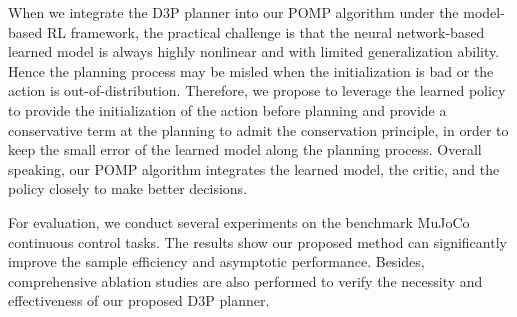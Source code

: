 \documentclass{article} %
\begin{document}
When we integrate the D3P planner into our POMP algorithm under the model-based RL framework, the practical challenge is that the neural network-based learned model is always highly nonlinear and with limited generalization ability. Hence the planning process may be misled when the initialization is bad or the action is out-of-distribution. 
Therefore, we propose to leverage the learned policy to provide the initialization of the action before planning and provide a conservative term at the planning to admit the conservation principle, in order to keep the small error of the learned model along the planning process.
Overall speaking, our POMP algorithm integrates the learned model, the critic, and the policy closely to make better decisions. 

For evaluation, we conduct several experiments on the benchmark MuJoCo  continuous control tasks. The results show  our proposed method can significantly improve the sample efficiency  and asymptotic performance. Besides, comprehensive ablation studies are also performed to verify the necessity and effectiveness of our proposed D3P planner.





\end{document}
